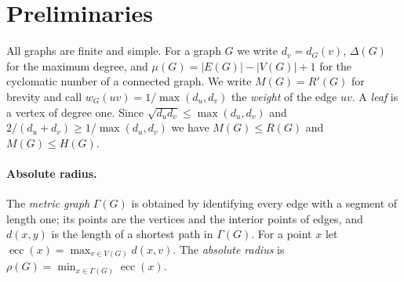 \documentclass[11pt]{amsart}
\theoremstyle{definition}
\newcommand{\ecc}{\operatorname{ecc}}
\newcommand{\Rp}{R'}
\begin{document}
\section{Preliminaries}\label{sec:prelim}

All graphs are finite and simple. For a graph $G$ we write $d_v=d_G(v)$, $\Delta(G)$ for the maximum degree, and
$\mu(G)=|E(G)|-|V(G)|+1$ for the cyclomatic number of a connected graph. We write $M(G)=\Rp(G)$ for brevity and
call $w_G(uv)=1/\max(d_u,d_v)$ the \emph{weight} of the edge $uv$. A \emph{leaf} is a vertex of degree one.
Since $\sqrt{d_ud_v}\le\max(d_u,d_v)$ and $2/(d_u+d_v)\ge 1/\max(d_u,d_v)$ we have $M(G)\le R(G)$ and $M(G)\le H(G)$.

\paragraph{Absolute radius.}
The \emph{metric graph} $\Gamma(G)$ is obtained by identifying every edge with a segment of length one; its points are
the vertices and the interior points of edges, and $d(x,y)$ is the length of a shortest path in $\Gamma(G)$. For a
point $x$ let $\ecc(x)=\max_{v\in V(G)}d(x,v)$. The \emph{absolute radius} is $\rho(G)=\min_{x\in\Gamma(G)}\ecc(x)$.
\end{document}
